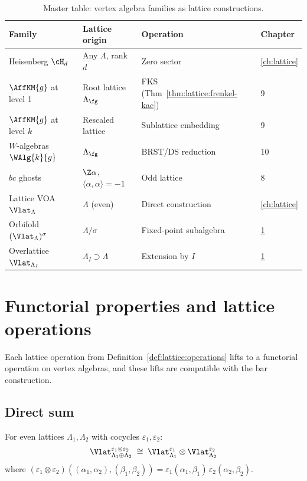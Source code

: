 \begin{table}[ht]
\centering
\caption{Master table: vertex algebra families as lattice constructions.}
\label{tab:lattice:master-table}
\begin{tabular}{l l l l}
\textbf{Family} & \textbf{Lattice origin} & \textbf{Operation} & \textbf{Chapter} \\
\hline
Heisenberg $\cH_d$
 & Any $\Lambda$, rank $d$ & Zero sector & \ref{ch:lattice} \\
$\AffKM{g}$ at level 1
 & Root lattice $\Lambda_\fg$ & FKS (Thm~\ref{thm:lattice:frenkel-kac}) & 9 \\
$\AffKM{g}$ at level $k$
 & Rescaled lattice & Sublattice embedding & 9 \\
$W$-algebras $\WAlg{k}{g}$
 & $\Lambda_\fg$ & BRST/DS reduction & 10 \\
$bc$ ghosts
 & $\Z\alpha$, $\langle\alpha,\alpha\rangle = -1$ & Odd lattice & 8 \\
Lattice VOA $\Vlat_\Lambda$
 & $\Lambda$ (even) & Direct construction & \ref{ch:lattice} \\
Orbifold $(\Vlat_\Lambda)^\sigma$
 & $\Lambda/\sigma$ & Fixed-point subalgebra & \ref{sec:lattice:functorial} \\
Overlattice $\Vlat_{\Lambda_I}$
 & $\Lambda_I \supset \Lambda$ & Extension by $I$ & \ref{sec:lattice:functorial}
\end{tabular}
\end{table}



\section{Functorial properties and lattice operations}
\label{sec:lattice:functorial}

Each lattice operation from
Definition~\ref{def:lattice:operations} lifts to a functorial operation
on vertex algebras, and these lifts are compatible with the bar
construction.

\subsection{Direct sum}

\begin{theorem}
\label{thm:lattice:direct-sum}
For even lattices $\Lambda_1, \Lambda_2$ with cocycles
$\varepsilon_1, \varepsilon_2$:
\begin{equation}\label{eq:lattice:tensor-product}
\Vlat_{\Lambda_1 \oplus \Lambda_2}^{\varepsilon_1 \otimes \varepsilon_2}
\;\cong\;
\Vlat_{\Lambda_1}^{\varepsilon_1}
\otimes \Vlat_{\Lambda_2}^{\varepsilon_2}
\end{equation}
where $(\varepsilon_1 \otimes \varepsilon_2)
((\alpha_1,\alpha_2),(\beta_1,\beta_2)) =
\varepsilon_1(\alpha_1,\beta_1)\,\varepsilon_2(\alpha_2,\beta_2)$.
\end{theorem}

